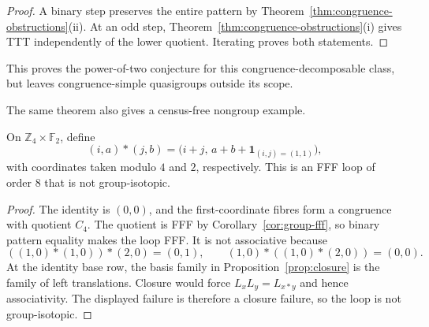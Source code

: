 \begin{proof}
A binary step preserves the entire pattern by
Theorem~\ref{thm:congruence-obstructions}(ii).  At an odd step,
Theorem~\ref{thm:congruence-obstructions}(i) gives TTT independently of the
lower quotient.  Iterating proves both statements.
\end{proof}

This proves the power-of-two conjecture for this congruence-decomposable
class, but leaves congruence-simple quasigroups outside its scope.

The same theorem also gives a census-free nongroup example.

\begin{theorem}
\label{thm:explicit-nongroup-loop}
On $\mathbb Z_4\times\mathbb F_2$, define
\[
 (i,a)*(j,b)=
 \bigl(i+j,\,a+b+\mathbf 1_{(i,j)=(1,1)}\bigr),
\]
with coordinates taken modulo $4$ and $2$, respectively.  This is an FFF
loop of order $8$ that is not group-isotopic.
\end{theorem}

\begin{proof}
The identity is $(0,0)$, and the first-coordinate fibres form a congruence
with quotient $C_4$.  The quotient is FFF by
Corollary~\ref{cor:group-fff}, so binary pattern equality makes the loop
FFF.  It is not associative because
\[
 ((1,0)*(1,0))*(2,0)=(0,1),\qquad
 (1,0)*((1,0)*(2,0))=(0,0).
\]
At the identity base row, the basis family in
Proposition~\ref{prop:closure} is the family of left translations.
Closure would force $L_xL_y=L_{x*y}$ and hence associativity.  The displayed
failure is therefore a closure failure, so the loop is not group-isotopic.
\end{proof}
